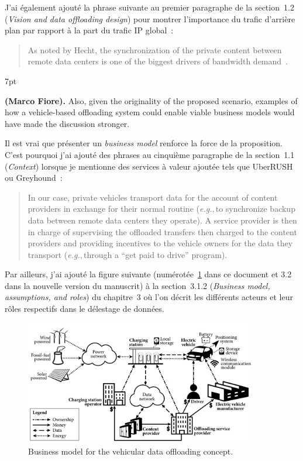 \documentclass[11pt]{article}
\newcommand{\eg}{\textit{e.g.},\,}
\newenvironment{formal}{%
  \vspace*{-5pt}
  \def\FrameCommand{%
    \hspace{-5pt}%
    {\color{gray50}\vrule width 1.25pt}%
    \colorbox{formalcolor}%
  }%
  \MakeFramed{\advance\hsize-\width\FrameRestore}%
  \noindent\hspace{-4.55pt}%
  \begin{adjustwidth}{}{7pt}%
  \normalsize
  \vspace{-2pt}
}
{%
  \vspace{2pt}\end{adjustwidth}\endMakeFramed%
  \vspace*{-10pt}
}
\begin{document}
J'ai également ajouté la phrase suivante au premier paragraphe de la section~1.2 (\textit{Vision and data offloading design}) pour montrer l'importance du trafic d'arrière plan par rapport à la part du trafic IP global~: 
\begin{quote}
As noted by Hecht, the synchronization of the private content between remote data centers is one of the biggest drivers of bandwidth demand~\cite{hecht2016bandwidth}.
\end{quote}

\begin{formal}
    \textbf{(Marco Fiore).} Also, given the originality of the proposed scenario, examples of how a vehicle-based offloading system could enable viable business models would have made the discussion stronger.
\end{formal}

Il est vrai que présenter un \textit{business model} renforce la force de la proposition. C'est pourquoi j'ai ajouté des phrases au cinquième paragraphe de la section~1.1 (\textit{Context}) lorsque je mentionne des services à valeur ajoutée tels que UberRUSH ou Greyhound~:

\begin{quote}
In our case, private vehicles transport data for the account of content providers in exchange for their normal routine (\eg to synchronize backup data between remote data centers they operate). A service provider is then in charge of supervising the offloaded transfers then charged to the content providers and providing incentives to the vehicle owners for the data they transport (\eg through a ``get paid to drive'' program).
\end{quote}

Par ailleurs, j'ai ajouté la figure suivante (numérotée~\ref{fig:business-model} dans ce document et 3.2 dans la nouvelle version du manuscrit) à la section~3.1.2 (\textit{Business model, assumptions, and roles}) du chapitre~3 où l'on décrit les différents acteurs et leur rôles respectifs dans le délestage de données.

\begin{figure}[h!]
    \centering
    \includegraphics[width=0.9\textwidth]{figures/business-plan.pdf}
    \caption{Business model for the vehicular data offloading concept.}
    \label{fig:business-model}
\end{figure}
\end{document}
